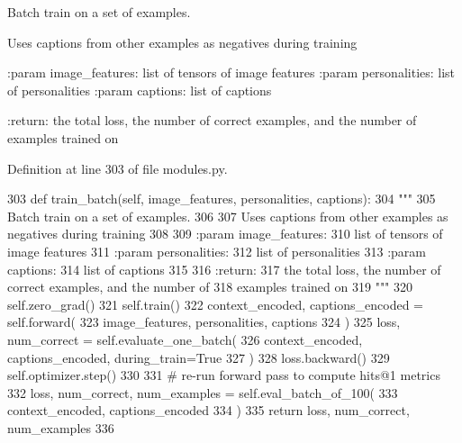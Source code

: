 \begin{DoxyVerb}Batch train on a set of examples.

Uses captions from other examples as negatives during training

:param image_features:
    list of tensors of image features
:param personalities:
    list of personalities
:param captions:
    list of captions

:return:
    the total loss, the number of correct examples, and the number of
    examples trained on
\end{DoxyVerb}
 

Definition at line 303 of file modules.\+py.


\begin{DoxyCode}
303     \textcolor{keyword}{def }train\_batch(self, image\_features, personalities, captions):
304         \textcolor{stringliteral}{"""}
305 \textcolor{stringliteral}{        Batch train on a set of examples.}
306 \textcolor{stringliteral}{}
307 \textcolor{stringliteral}{        Uses captions from other examples as negatives during training}
308 \textcolor{stringliteral}{}
309 \textcolor{stringliteral}{        :param image\_features:}
310 \textcolor{stringliteral}{            list of tensors of image features}
311 \textcolor{stringliteral}{        :param personalities:}
312 \textcolor{stringliteral}{            list of personalities}
313 \textcolor{stringliteral}{        :param captions:}
314 \textcolor{stringliteral}{            list of captions}
315 \textcolor{stringliteral}{}
316 \textcolor{stringliteral}{        :return:}
317 \textcolor{stringliteral}{            the total loss, the number of correct examples, and the number of}
318 \textcolor{stringliteral}{            examples trained on}
319 \textcolor{stringliteral}{        """}
320         self.zero\_grad()
321         self.train()
322         context\_encoded, captions\_encoded = self.forward(
323             image\_features, personalities, captions
324         )
325         loss, num\_correct = self.evaluate\_one\_batch(
326             context\_encoded, captions\_encoded, during\_train=\textcolor{keyword}{True}
327         )
328         loss.backward()
329         self.optimizer.step()
330 
331         \textcolor{comment}{# re-run forward pass to compute hits@1 metrics}
332         loss, num\_correct, num\_examples = self.eval\_batch\_of\_100(
333             context\_encoded, captions\_encoded
334         )
335         \textcolor{keywordflow}{return} loss, num\_correct, num\_examples
336 
\end{DoxyCode}
\mbox{\label{classprojects_1_1personality__captions_1_1transresnet_1_1modules_1_1TransresnetModel_a7a9e68b5978bb8b9c681a9ce0015d3c3}} 
